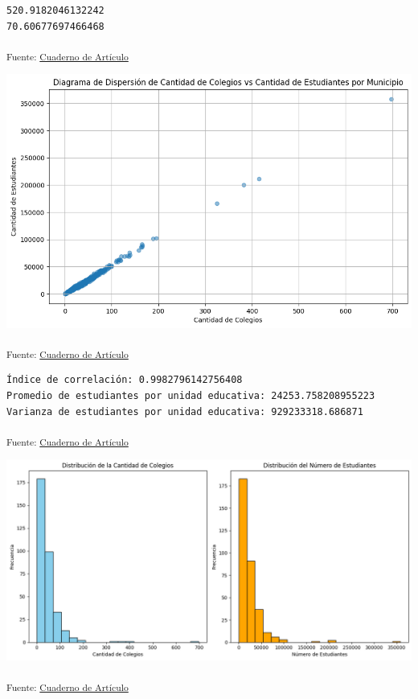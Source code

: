 \documentclass[
  12pt]{article}
\begin{document}
\begin{verbatim}
520.9182046132242
70.60677697466468
\end{verbatim}

\textsubscript{Fuente:
\href{https://sociest.github.io/ue-report/index.ipynb.html}{Cuaderno de
Artículo}}

\includegraphics{index_files/figure-pdf/cell-11-output-1.png}

\textsubscript{Fuente:
\href{https://sociest.github.io/ue-report/index.ipynb.html}{Cuaderno de
Artículo}}

\begin{verbatim}
Índice de correlación: 0.9982796142756408
Promedio de estudiantes por unidad educativa: 24253.758208955223
Varianza de estudiantes por unidad educativa: 929233318.686871
\end{verbatim}

\textsubscript{Fuente:
\href{https://sociest.github.io/ue-report/index.ipynb.html}{Cuaderno de
Artículo}}

\includegraphics{index_files/figure-pdf/cell-13-output-1.png}

\textsubscript{Fuente:
\href{https://sociest.github.io/ue-report/index.ipynb.html}{Cuaderno de
Artículo}}
\end{document}
